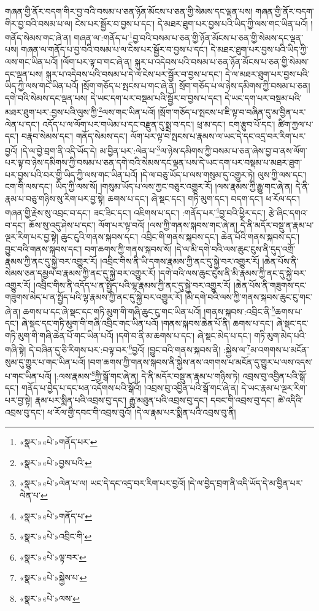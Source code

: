 གཞན་གྱི་ནོར་བདག་གིར་བྱ་བའི་བསམ་པ་ཅན་ཉོན་མོངས་པ་ཅན་གྱི་སེམས་དང་ལྡན་པས། གཞན་གྱི་ནོར་བདག་གིར་བྱ་བའི་བསམ་པ་ལ། ངེས་པར་སྦྱོར་བ་བྱས་པ་དང་། དེ་མཐར་ཐུག་པར་བྱས་པའི་ཡིད་ཀྱི་ལས་གང་ཡིན་པའོ། །གནོད་སེམས་གང་ཞེ་ན། གཞན་ལ་:གནོད་པ་\footnote{«སྣར་»«པེ་»གནོད་པར་}བྱ་བའི་བསམ་པ་ཅན་གྱི་ཉོན་མོངས་པ་ཅན་གྱི་སེམས་དང་ལྡན་པས། གཞན་ལ་གནོད་པ་བྱ་བའི་བསམ་པ་ལ་ངེས་པར་སྦྱོར་བ་བྱས་པ་དང་། དེ་མཐར་ཐུག་པར་བྱས་པའི་ཡིད་ཀྱི་ལས་གང་ཡིན་པའོ། །ལོག་པར་ལྟ་བ་གང་ཞེ་ན། སྐུར་པ་འདེབས་པའི་བསམ་པ་ཅན་ཉོན་མོངས་པ་ཅན་གྱི་སེམས་དང་ལྡན་པས། སྐུར་པ་འདེབས་པའི་བསམ་པ་དེ་ལ་ངེས་པར་སྦྱོར་བ་བྱས་པ་དང་། དེ་ལ་མཐར་ཐུག་པར་བྱས་པའི་ཡིད་ཀྱི་ལས་གང་ཡིན་པའོ། །སྲོག་གཅོད་པ་སྤངས་པ་གང་ཞེ་ན། སྲོག་གཅོད་པ་ལ་ཉེས་དམིགས་ཀྱི་བསམ་པ་ཅན། དགེ་བའི་སེམས་དང་ལྡན་པས། དེ་ཡང་དག་པར་བསྡམ་པའི་སྦྱོར་བ་བྱས་པ་དང་། དེ་ཡང་དག་པར་བསྡམ་པའི་མཐར་ཐུག་པར་:བྱས་པའི་ལུས་ཀྱི་\footnote{«སྣར་»«པེ་»བྱས་པའི་}ལས་གང་ཡིན་པའོ། །སྲོག་གཅོད་པ་སྤངས་པ་ཇི་ལྟ་བ་བཞིན་དུ་མ་བྱིན་པར་ལེན་པ་དང་། འདོད་པ་ལ་ལོག་པར་གཡེམ་པ་དང་བརྫུན་དུ་སྨྲ་བ་དང་། ཕྲ་མ་དང་། ངག་རྩུབ་པོ་དང་། ཚིག་ཀྱལ་པ་དང་། བརྣབ་སེམས་དང་། གནོད་སེམས་དང་། ལོག་པར་ལྟ་བ་སྤངས་པ་རྣམས་ལ་ཡང་དེ་དང་འདྲ་བར་རིག་པར་བྱའོ། །དེ་ལ་བྱེ་བྲག་ནི་འདི་ཡོད་དེ། མ་བྱིན་པར་:ལེན་པ་\footnote{«སྣར་»«པེ་»ལེན་པ་ལ། ཡང་དེ་དང་འདྲ་བར་རིག་པར་བྱའོ། །དེ་ལ་བྱེད་བྲག་ནི་འདི་ཡོད་དེ་མ་བྱིན་པར་ལེན་པ་}ལ་ཉེས་དམིགས་ཀྱི་བསམ་པ་ཅན་ཞེས་བྱ་བ་ནས་ལོག་པར་ལྟ་བ་ཉེས་དམིགས་ཀྱི་བསམ་པ་ཅན་དགེ་བའི་སེམས་དང་ལྡན་པས་དེ་ཡང་དག་པར་བསྡམ་པ་མཐར་ཐུག་པར་བྱས་པའི་བར་གྱི་ཡིད་ཀྱི་ལས་གང་ཡིན་པའོ། །དེ་ལ་བཅུ་ཡོད་པ་ལས་གསུམ་དུ་འགྱུར་ཏེ། ལུས་ཀྱི་ལས་དང་། ངག་གི་ལས་དང་། ཡིད་ཀྱི་ལས་སོ། །གསུམ་ཡོད་པ་ལས་ཀྱང་བཅུར་འགྱུར་རོ། །ལས་རྣམས་ཀྱི་རྒྱུ་གང་ཞེ་ན། དེ་ནི་རྣམ་པ་བཅུ་གཉིས་སུ་རིག་པར་བྱ་སྟེ། ཆགས་པ་དང་། ཞེ་སྡང་དང་། གཏི་མུག་དང་། བདག་དང་། ཕ་རོལ་དང་། གཞན་གྱི་རྗེས་སུ་འབྲང་བ་དང་། ཟང་ཟིང་དང་། འཇིགས་པ་དང་། :གནོད་པར་\footnote{«སྣར་»«པེ་»གནོད་པ་}བྱ་བའི་ཕྱིར་དང་། རྩེ་ཞིང་དགའ་བ་དང་། ཆོས་སུ་འདུ་ཤེས་པ་དང་། ལོག་པར་ལྟ་བའོ། །ལས་ཀྱི་གནས་སྐབས་གང་ཞེ་ན། དེ་ནི་མདོར་བསྡུ་ན་རྣམ་པ་ལྔར་རིག་པར་བྱ་སྟེ། ཆུང་ངུའི་གནས་སྐབས་དང་། འབྲིང་གི་གནས་སྐབས་དང་། ཆེན་པོའི་གནས་སྐབས་དང་། བྱུང་བའི་གནས་སྐབས་དང་། བག་ཆགས་ཀྱི་གནས་སྐབས་སོ། །དེ་ལ་མི་དགེ་བའི་ལས་ཆུང་ངུས་ནི་དུད་འགྲོ་རྣམས་ཀྱི་ནང་དུ་སྐྱེ་བར་འགྱུར་རོ། །འབྲིང་གིས་ནི་ཡི་དགས་རྣམས་ཀྱི་ནང་དུ་སྐྱེ་བར་འགྱུར་རོ། །ཆེན་པོས་ནི་སེམས་ཅན་དམྱལ་བ་རྣམས་ཀྱི་ནང་དུ་སྐྱེ་བར་འགྱུར་རོ། །དགེ་བའི་ལས་ཆུང་ངུས་ནི་མི་རྣམས་ཀྱི་ནང་དུ་སྐྱེ་བར་འགྱུར་རོ། །འབྲིང་གིས་ནི་འདོད་པ་ན་སྤྱོད་པའི་ལྷ་རྣམས་ཀྱི་ནང་དུ་སྐྱེ་བར་འགྱུར་རོ། །ཆེན་པོས་ནི་གཟུགས་དང་གཟུགས་མེད་པ་ན་སྤྱོད་པའི་ལྷ་རྣམས་ཀྱི་ནང་དུ་སྐྱེ་བར་འགྱུར་རོ། །མི་དགེ་བའི་ལས་ཀྱི་གནས་སྐབས་ཆུང་ངུ་གང་ཞེ་ན། ཆགས་པ་དང་ཞེ་སྡང་དང་གཏི་མུག་གི་གཞི་ཆུང་ངུ་གང་ཡིན་པའོ། །གནས་སྐབས་:འབྲིང་ནི་\footnote{«སྣར་»«པེ་»འབྲིང་གི་}ཆགས་པ་དང་། ཞེ་སྡང་དང་གཏི་མུག་གི་གཞི་འབྲིང་གང་ཡིན་པའོ། །གནས་སྐབས་ཆེན་པོ་ནི། ཆགས་པ་དང་། ཞེ་སྡང་དང་གཏི་མུག་གི་གཞི་ཆེན་པོ་གང་ཡིན་པའོ། །དགེ་བ་ནི་མ་ཆགས་པ་དང་། ཞེ་སྡང་མེད་པ་དང་། གཏི་མུག་མེད་པའི་གཞི་སྟེ། དེ་བཞིན་དུ་ཅི་རིགས་པར་:བལྟ་བར་\footnote{«སྣར་»«པེ་»ལྟ་བར་}བྱའོ། །བྱུང་བའི་གནས་སྐབས་ནི། :སྐྱེས་ལ་\footnote{«སྣར་»«པེ་»སྐྱེས་པ་}མ་འགགས་པ་མངོན་སུམ་དུ་གྱུར་པ་གང་ཡིན་པའོ། །བག་ཆགས་ཀྱི་གནས་སྐབས་ནི་སྐྱེས་ནས་འགགས་པ་མངོན་དུ་གྱུར་པ་ལས་འདས་པ་གང་ཡིན་པའོ། །:ལས་རྣམས་\footnote{«སྣར་»«པེ་»ལས་}ཀྱི་སྒོ་གང་ཞེ་ན། དེ་ནི་མདོར་བསྡུ་ན་རྣམ་པ་གཉིས་ཏེ། འབྲས་བུ་འབྱིན་པའི་སྒོ་དང་། གནོད་པ་བྱེད་པ་དང་ཕན་འདོགས་པའི་སྒོའོ། །འབྲས་བུ་འབྱིན་པའི་སྒོ་གང་ཞེ་ན། དེ་ཡང་རྣམ་པ་ལྔར་རིག་པར་བྱ་སྟེ། རྣམ་པར་སྨིན་པའི་འབྲས་བུ་དང་། རྒྱུ་མཐུན་པའི་འབྲས་བུ་དང་། དབང་གི་འབྲས་བུ་དང་། ཚེ་འདིའི་འབྲས་བུ་དང་། ཕ་རོལ་གྱི་དབང་གི་འབྲས་བུའོ། །དེ་ལ་རྣམ་པར་སྨིན་པའི་འབྲས་བུ་ནི། 